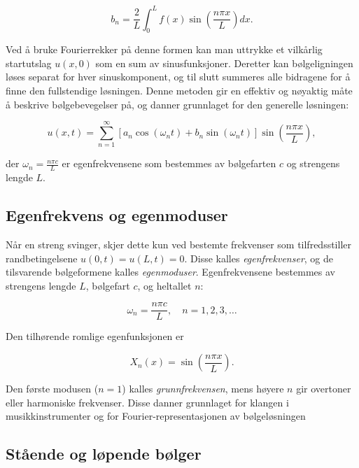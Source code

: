 \begin{equation*}
b_n = \frac{2}{L} \int_{0}^{L} f(x) \sin\left(\frac{n\pi x}{L}\right) dx.
\end{equation*}

Ved å bruke Fourierrekker på denne formen kan man uttrykke et vilkårlig startutslag $u(x,0)$ som en sum av sinusfunksjoner.  
Deretter kan bølgeligningen løses separat for hver sinuskomponent, og til slutt summeres alle bidragene for å finne den fullstendige løsningen.  
Denne metoden gir en effektiv og nøyaktig måte å beskrive bølgebevegelser på, og danner grunnlaget for den generelle løsningen:

\begin{equation*}
u(x,t) = \sum_{n=1}^{\infty} \left[a_n \cos(\omega_n t) + b_n \sin(\omega_n t)\right] \sin\left(\frac{n\pi x}{L}\right),
\end{equation*}

der $\omega_n = \frac{n\pi c}{L}$ er egenfrekvensene som bestemmes av bølgefarten $c$ og strengens lengde $L$.

\subsection{Egenfrekvens og egenmoduser}

Når en streng svinger, skjer dette kun ved bestemte frekvenser som tilfredsstiller randbetingelsene $u(0,t)=u(L,t)=0$.  
Disse kalles \textit{egenfrekvenser}, og de tilsvarende bølgeformene kalles \textit{egenmoduser}.  
Egenfrekvensene bestemmes av strengens lengde $L$, bølgefart $c$, og heltallet $n$:

\begin{equation*}
\omega_n = \frac{n\pi c}{L}, \quad n = 1,2,3,\dots
\end{equation*}

Den tilhørende romlige egenfunksjonen er

\begin{equation*}
X_n(x) = \sin\left(\frac{n\pi x}{L}\right).
\end{equation*}

Den første modusen ($n=1$) kalles \textit{grunnfrekvensen}, mens høyere $n$ gir overtoner eller harmoniske frekvenser.  
Disse danner grunnlaget for klangen i musikkinstrumenter og for Fourier-representasjonen av bølgeløsningen \parencite{physicsClassroomFundamental}

\subsection{Stående og løpende bølger}

